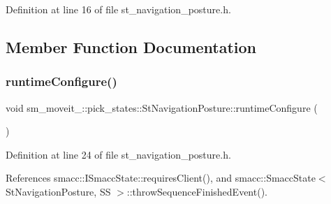 Definition at line 16 of file st\+\_\+navigation\+\_\+posture.\+h.



\subsection{Member Function Documentation}
\mbox{\label{structsm__moveit__4_1_1pick__states_1_1StNavigationPosture_a224f91484ed745b360dd97c0fef63567}} 
\subsubsection{\texorpdfstring{runtime\+Configure()}{runtimeConfigure()}}
{\footnotesize\ttfamily void sm\+\_\+moveit\+\_\+::pick\+\_\+states\+::\+St\+Navigation\+Posture\+::runtime\+Configure (\begin{DoxyParamCaption}{ }\end{DoxyParamCaption})\hspace{0.3cm}{\ttfamily [inline]}}



Definition at line 24 of file st\+\_\+navigation\+\_\+posture.\+h.



References smacc\+::\+I\+Smacc\+State\+::requires\+Client(), and smacc\+::\+Smacc\+State$<$ St\+Navigation\+Posture, S\+S $>$\+::throw\+Sequence\+Finished\+Event().


